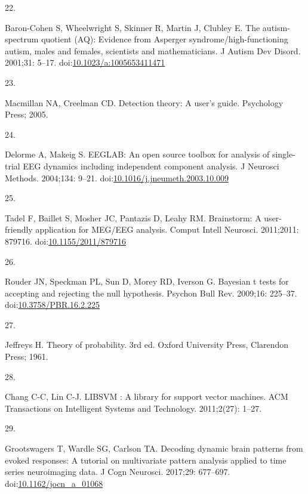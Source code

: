 \documentclass[
]{article}
\newlength{\cslhangindent}
\newlength{\csllabelwidth}
\newenvironment{CSLReferences}[2] %
 {\begin{list}{}{%
  \setlength{\itemindent}{0pt}
  \setlength{\leftmargin}{0pt}
  \setlength{\parsep}{0pt}
  \ifodd #1
   \setlength{\leftmargin}{\cslhangindent}
   \setlength{\itemindent}{-1\cslhangindent}
  \fi
  \setlength{\itemsep}{#2\baselineskip}}}
 {\end{list}}
\newcommand{\CSLLeftMargin}[1]{\parbox[t]{\csllabelwidth}{\strut#1\strut}}
\newcommand{\CSLRightInline}[1]{\parbox[t]{\linewidth - \csllabelwidth}{\strut#1\strut}}
\begin{document}
\begin{CSLReferences}{0}{1}
\CSLLeftMargin{22. }%
\CSLRightInline{Baron-Cohen S, Wheelwright S, Skinner R, Martin J, Clubley E. The autism-spectrum quotient (AQ): Evidence from {Asperger} syndrome/high-functioning autism, males and females, scientists and mathematicians. J Autism Dev Disord. 2001;31: 5--17. doi:\href{https://doi.org/10.1023/a:1005653411471}{10.1023/a:1005653411471}}

\CSLLeftMargin{23. }%
\CSLRightInline{Macmillan NA, Creelman CD. Detection theory: A user's guide. Psychology Press; 2005. }

\CSLLeftMargin{24. }%
\CSLRightInline{Delorme A, Makeig S. {EEGLAB}: An open source toolbox for analysis of single-trial {EEG} dynamics including independent component analysis. J Neurosci Methods. 2004;134: 9--21. doi:\href{https://doi.org/10.1016/j.jneumeth.2003.10.009}{10.1016/j.jneumeth.2003.10.009}}

\CSLLeftMargin{25. }%
\CSLRightInline{Tadel F, Baillet S, Mosher JC, Pantazis D, Leahy RM. Brainstorm: A user-friendly application for MEG/EEG analysis. Comput Intell Neurosci. 2011;2011: 879716. doi:\href{https://doi.org/10.1155/2011/879716}{10.1155/2011/879716}}

\CSLLeftMargin{26. }%
\CSLRightInline{Rouder JN, Speckman PL, Sun D, Morey RD, Iverson G. Bayesian t tests for accepting and rejecting the null hypothesis. Psychon Bull Rev. 2009;16: 225--37. doi:\href{https://doi.org/10.3758/PBR.16.2.225}{10.3758/PBR.16.2.225}}

\CSLLeftMargin{27. }%
\CSLRightInline{Jeffreys H. Theory of probability. 3rd ed. Oxford University Press, Clarendon Press; 1961. }

\CSLLeftMargin{28. }%
\CSLRightInline{Chang C-C, Lin C-J. {LIBSVM} : A library for support vector machines. ACM Transactions on Intelligent Systems and Technology. 2011;2(27): 1--27. }

\CSLLeftMargin{29. }%
\CSLRightInline{Grootswagers T, Wardle SG, Carlson TA. Decoding dynamic brain patterns from evoked responses: A tutorial on multivariate pattern analysis applied to time series neuroimaging data. J Cogn Neurosci. 2017;29: 677--697. doi:\href{https://doi.org/10.1162/jocn_a_01068}{10.1162/jocn\_a\_01068}}


\end{CSLReferences}
\end{document}
